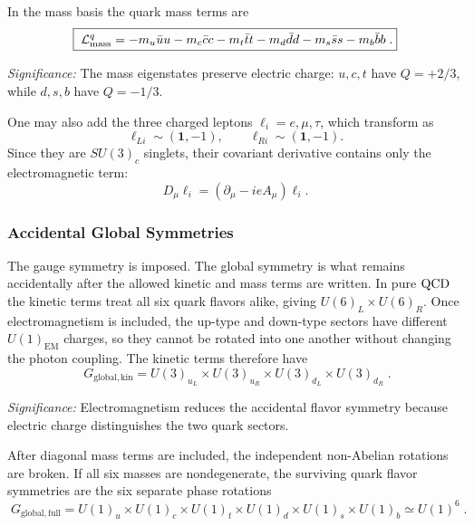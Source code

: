 In the mass basis the quark mass terms are
\begin{equation}
  \boxed{\;
  \mathcal{L}_{\mathrm{mass}}^{q}
  =-m_u\bar uu-m_c\bar cc-m_t\bar tt
   -m_d\bar dd-m_s\bar ss-m_b\bar bb\; .}
  \label{eq:lec15:quark_mass_terms}
\end{equation}

\textit{Significance:} The mass eigenstates preserve electric charge: $u,c,t$ have $Q=+2/3$, while $d,s,b$ have $Q=-1/3$.

One may also add the three charged leptons $\ell_i=e,\mu,\tau$, which transform as
\begin{equation}
  \ell_{Li}\sim(\mathbf1,-1),\qquad \ell_{Ri}\sim(\mathbf1,-1).
  \label{eq:lec15:charged_lepton_representations}
\end{equation}
Since they are $SU(3)_c$ singlets, their covariant derivative contains only the electromagnetic term:
\begin{equation}
  D_\mu\ell_i=(\partial_\mu-i e A_\mu)\ell_i .
  \label{eq:lec15:lepton_covariant_derivative}
\end{equation}

\subsubsection*{Accidental Global Symmetries}

The gauge symmetry is imposed. The global symmetry is what remains accidentally after the allowed kinetic and mass terms are written. In pure $\mathrm{QCD}$ the kinetic terms treat all six quark flavors alike, giving $U(6)_L\times U(6)_R$. Once electromagnetism is included, the up-type and down-type sectors have different $U(1)_{\mathrm{EM}}$ charges, so they cannot be rotated into one another without changing the photon coupling. The kinetic terms therefore have
\begin{equation}
  \boxed{\;G_{\mathrm{global,kin}}
  =U(3)_{u_L}\times U(3)_{u_R}\times U(3)_{d_L}\times U(3)_{d_R}\; .}
  \label{eq:lec15:qcd_qed_kinetic_global_symmetry}
\end{equation}

\textit{Significance:} Electromagnetism reduces the accidental flavor symmetry because electric charge distinguishes the two quark sectors.

After diagonal mass terms are included, the independent non-Abelian rotations are broken. If all six masses are nondegenerate, the surviving quark flavor symmetries are the six separate phase rotations
\begin{equation}
  \boxed{\;G_{\mathrm{global,full}}=U(1)_u\times U(1)_c\times U(1)_t
  \times U(1)_d\times U(1)_s\times U(1)_b\simeq U(1)^6\; .}
  \label{eq:lec15:qcd_qed_full_global_symmetry}
\end{equation}

